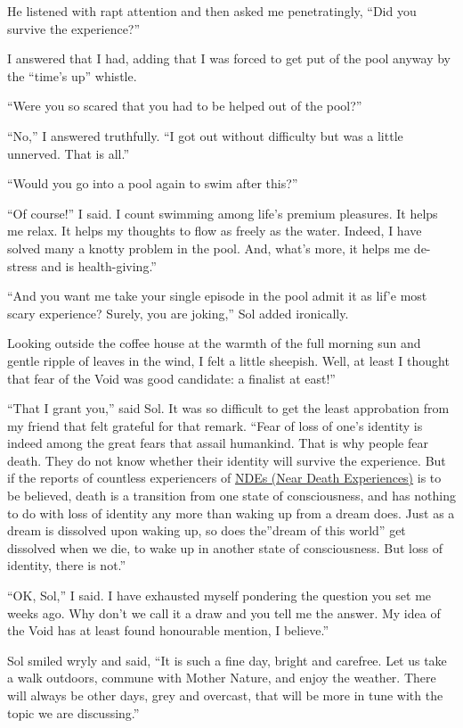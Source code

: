 \documentclass[
  a4paper,
]{article}
\begin{document}
He listened with rapt attention and then asked me penetratingly, ``Did
you survive the experience?''

I answered that I had, adding that I was forced to get put of the pool
anyway by the ``time's up'' whistle.

``Were you so scared that you had to be helped out of the pool?''

``No,'' I answered truthfully. ``I got out without difficulty but was a
little unnerved. That is all.''

``Would you go into a pool again to swim after this?''

``Of course!'' I said. I count swimming among life's premium pleasures.
It helps me relax. It helps my thoughts to flow as freely as the water.
Indeed, I have solved many a knotty problem in the pool. And, what's
more, it helps me de-stress and is health-giving.''

``And you want me take your single episode in the pool admit it as lif'e
most scary experience? Surely, you are joking,'' Sol added ironically.

Looking outside the coffee house at the warmth of the full morning sun
and gentle ripple of leaves in the wind, I felt a little sheepish. Well,
at least I thought that fear of the Void was good candidate: a finalist
at east!''

``That I grant you,'' said Sol. It was so difficult to get the least
approbation from my friend that felt grateful for that remark. ``Fear of
loss of one's identity is indeed among the great fears that assail
humankind. That is why people fear death. They do not know whether their
identity will survive the experience. But if the reports of countless
experiencers of \href{}{NDEs (Near Death Experiences)} is to be
believed, death is a transition from one state of consciousness, and has
nothing to do with loss of identity any more than waking up from a dream
does. Just as a dream is dissolved upon waking up, so does the''dream of
this world'' get dissolved when we die, to wake up in another state of
consciousness. But loss of identity, there is not.''

``OK, Sol,'' I said. I have exhausted myself pondering the question you
set me weeks ago. Why don't we call it a draw and you tell me the
answer. My idea of the Void has at least found honourable mention, I
believe.''

Sol smiled wryly and said, ``It is such a fine day, bright and carefree.
Let us take a walk outdoors, commune with Mother Nature, and enjoy the
weather. There will always be other days, grey and overcast, that will
be more in tune with the topic we are discussing.''
\end{document}
